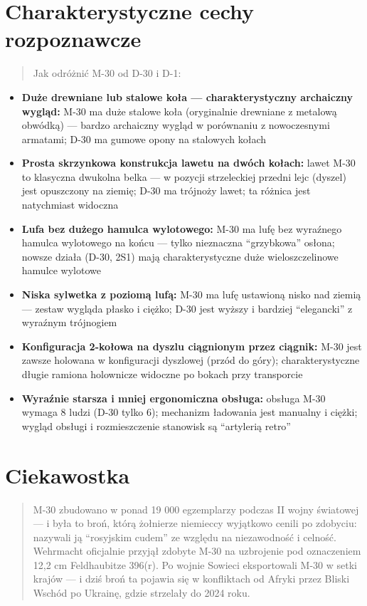 \documentclass[12pt,openany,oneside]{book}
\providecommand{\tightlist}{%
  \setlength{\itemsep}{0pt}\setlength{\parskip}{0pt}}
\begin{document}
\section{Charakterystyczne cechy
rozpoznawcze}\label{charakterystyczne-cechy-rozpoznawcze-17}

\begin{quote}
Jak odróżnić M-30 od D-30 i D-1:
\end{quote}

\begin{itemize}
\tightlist
\item
  \textbf{Duże drewniane lub stalowe koła --- charakterystyczny
  archaiczny wygląd:} M-30 ma duże stalowe koła (oryginalnie drewniane z
  metalową obwódką) --- bardzo archaiczny wygląd w porównaniu z
  nowoczesnymi armatami; D-30 ma gumowe opony na stalowych kołach
\item
  \textbf{Prosta skrzynkowa konstrukcja lawetu na dwóch kołach:} lawet
  M-30 to klasyczna dwukolna belka --- w pozycji strzeleckiej przedni
  lejc (dyszel) jest opuszczony na ziemię; D-30 ma trójnoży lawet; ta
  różnica jest natychmiast widoczna
\item
  \textbf{Lufa bez dużego hamulca wylotowego:} M-30 ma lufę bez
  wyraźnego hamulca wylotowego na końcu --- tylko nieznaczna
  ``grzybkowa'' osłona; nowsze działa (D-30, 2S1) mają charakterystyczne
  duże wieloszczelinowe hamulce wylotowe
\item
  \textbf{Niska sylwetka z poziomą lufą:} M-30 ma lufę ustawioną nisko
  nad ziemią --- zestaw wygląda płasko i ciężko; D-30 jest wyższy i
  bardziej ``elegancki'' z wyraźnym trójnogiem
\item
  \textbf{Konfiguracja 2-kołowa na dyszlu ciągnionym przez ciągnik:}
  M-30 jest zawsze holowana w konfiguracji dyszlowej (przód do góry);
  charakterystyczne długie ramiona holownicze widoczne po bokach przy
  transporcie
\item
  \textbf{Wyraźnie starsza i mniej ergonomiczna obsługa:} obsługa M-30
  wymaga 8 ludzi (D-30 tylko 6); mechanizm ładowania jest manualny i
  ciężki; wygląd obsługi i rozmieszczenie stanowisk są ``artylerią
  retro''
\end{itemize}

\section{Ciekawostka}\label{ciekawostka-17}

\begin{quote}
M-30 zbudowano w ponad 19 000 egzemplarzy podczas II wojny światowej ---
i była to broń, którą żołnierze niemieccy wyjątkowo cenili po zdobyciu:
nazywali ją ``rosyjskim cudem'' ze względu na niezawodność i celność.
Wehrmacht oficjalnie przyjął zdobyte M-30 na uzbrojenie pod oznaczeniem
12,2 cm Feldhaubitze 396(r). Po wojnie Sowieci eksportowali M-30 w setki
krajów --- i dziś broń ta pojawia się w konfliktach od Afryki przez
Bliski Wschód po Ukrainę, gdzie strzelały do 2024 roku.
\end{quote}
\end{document}
